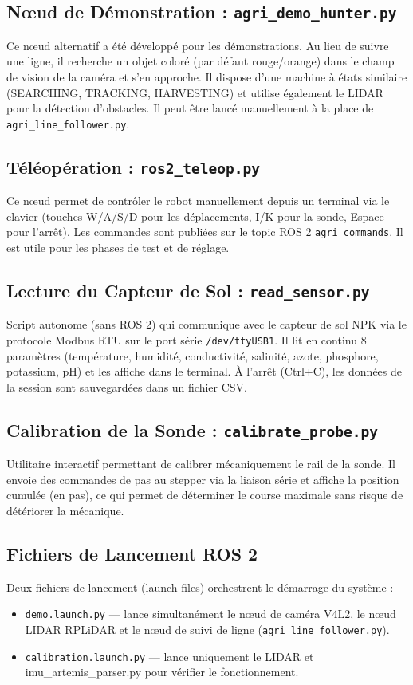 \documentclass [12pt, a4paper]{article}
\begin{document}
\subsection{Nœud de Démonstration : \texttt{agri\_demo\_hunter.py}}
Ce nœud alternatif a été développé pour les démonstrations. Au lieu de suivre une ligne, il recherche un objet coloré (par défaut rouge/orange) dans le champ de vision de la caméra et s'en approche. Il dispose d'une machine à états similaire (SEARCHING, TRACKING, HARVESTING) et utilise également le LIDAR pour la détection d'obstacles. Il peut être lancé manuellement à la place de \texttt{agri\_line\_follower.py}.

\subsection{Téléopération : \texttt{ros2\_teleop.py}}
Ce nœud permet de contrôler le robot manuellement depuis un terminal via le clavier (touches W/A/S/D pour les déplacements, I/K pour la sonde, Espace pour l'arrêt). Les commandes sont publiées sur le topic ROS 2 \texttt{agri\_commands}. Il est utile pour les phases de test et de réglage.

\subsection{Lecture du Capteur de Sol : \texttt{read\_sensor.py}}
Script autonome (sans ROS 2) qui communique avec le capteur de sol NPK via le protocole Modbus RTU sur le port série \texttt{/dev/ttyUSB1}. Il lit en continu 8 paramètres (température, humidité, conductivité, salinité, azote, phosphore, potassium, pH) et les affiche dans le terminal. À l'arrêt (Ctrl+C), les données de la session sont sauvegardées dans un fichier CSV.

\subsection{Calibration de la Sonde : \texttt{calibrate\_probe.py}}
Utilitaire interactif permettant de calibrer mécaniquement le rail de la sonde. Il envoie des commandes de pas au stepper via la liaison série et affiche la position cumulée (en pas), ce qui permet de déterminer le course maximale sans risque de détériorer la mécanique.

\subsection{Fichiers de Lancement ROS 2}
Deux fichiers de lancement (launch files) orchestrent le démarrage du système :
\begin{itemize}
    \item \texttt{demo.launch.py} — lance simultanément le nœud de caméra V4L2, le nœud LIDAR RPLiDAR et le nœud de suivi de ligne 
    (\texttt{agri\_line\_follower.py}).
    \item \texttt{calibration.launch.py} — lance uniquement le LIDAR et imu\_artemis\_parser.py pour vérifier le fonctionnement.
\end{itemize}
\end{document}
